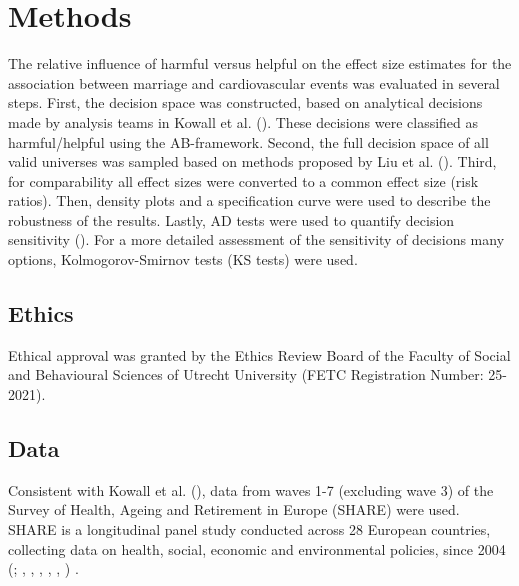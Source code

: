 \documentclass[
  man,
  floatsintext,
  longtable,
  nolmodern,
  notxfonts,
  notimes,
  colorlinks=true,linkcolor=blue,citecolor=blue,urlcolor=blue]{apa7}
\begin{document}
\section{Methods}\label{methods}

The relative influence of harmful versus helpful on the effect size
estimates for the association between marriage and cardiovascular events
was evaluated in several steps. First, the decision space was
constructed, based on analytical decisions made by analysis teams in
Kowall et al. (). These
decisions were classified as harmful/helpful using the AB-framework.
Second, the full decision space of all valid universes was sampled based
on methods proposed by Liu et al.
(). Third, for comparability
all effect sizes were converted to a common effect size (risk ratios).
Then, density plots and a specification curve were used to describe the
robustness of the results. Lastly, AD tests were used to quantify
decision sensitivity (). For a more detailed assessment of the sensitivity of
decisions many options, Kolmogorov-Smirnov tests (KS tests) were used.

\subsection{Ethics}\label{ethics}

Ethical approval was granted by the Ethics Review Board of the Faculty
of Social and Behavioural Sciences of Utrecht University (FETC
Registration Number: 25-2021).

\subsection{Data}\label{data}

Consistent with Kowall et al.
(), data from waves 1-7
(excluding wave 3) of the Survey of Health, Ageing and Retirement in
Europe (SHARE) were used. SHARE is a longitudinal panel study conducted
across 28 European countries, collecting data on health, social,
economic and environmental policies, since 2004
(;
,
,
,
,
,
) .
\end{document}
